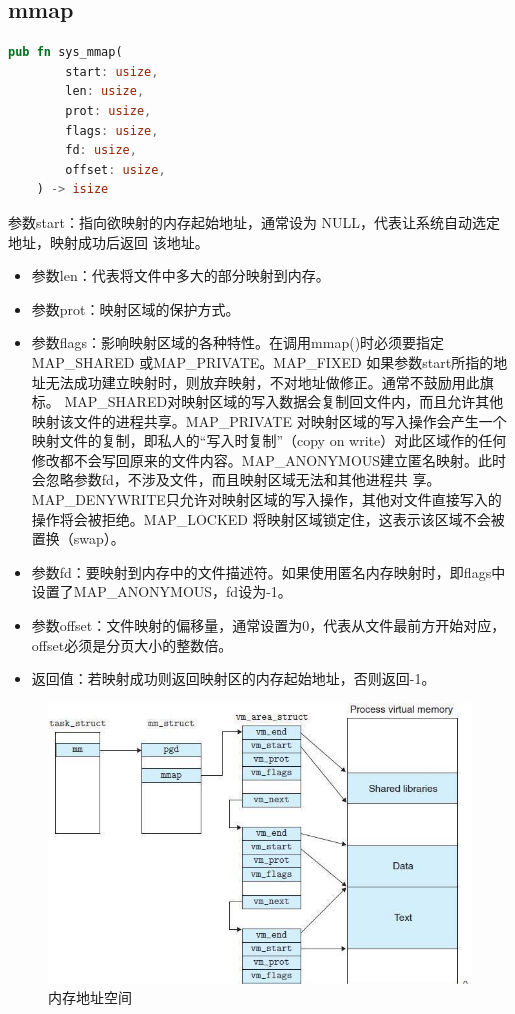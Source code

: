 \subsection{mmap}
\begin{lstlisting}[language=rust,caption={sys_mmap}]
    pub fn sys_mmap(
        start: usize,
        len: usize,
        prot: usize,
        flags: usize,
        fd: usize,
        offset: usize,
    ) -> isize
\end{lstlisting}
参数start：指向欲映射的内存起始地址，通常设为 NULL，代表让系统自动选定地址，映射成功后返回
该地址。
\begin{itemize}
    \item 参数len：代表将文件中多大的部分映射到内存。
    \item 参数prot：映射区域的保护方式。
    \item 参数flags：影响映射区域的各种特性。在调用mmap()时必须要指定MAP_SHARED 或MAP_PRIVATE。MAP_FIXED 如果参数start所指的地址无法成功建立映射时，则放弃映射，不对地址做修正。通常不鼓励用此旗标。
    MAP_SHARED对映射区域的写入数据会复制回文件内，而且允许其他映射该文件的进程共享。MAP_PRIVATE 对映射区域的写入操作会产生一个映射文件的复制，即私人的“写入时复制”（copy on
    write）对此区域作的任何修改都不会写回原来的文件内容。MAP_ANONYMOUS建立匿名映射。此时会忽略参数fd，不涉及文件，而且映射区域无法和其他进程共
    享。MAP_DENYWRITE只允许对映射区域的写入操作，其他对文件直接写入的操作将会被拒绝。MAP_LOCKED 将映射区域锁定住，这表示该区域不会被置换（swap）。
    \item 参数fd：要映射到内存中的文件描述符。如果使用匿名内存映射时，即flags中设置了MAP_ANONYMOUS，fd设为-1。
    \item 参数offset：文件映射的偏移量，通常设置为0，代表从文件最前方开始对应，offset必须是分页大小的整数倍。
    \item 返回值：若映射成功则返回映射区的内存起始地址，否则返回-1。
\end{itemize}

\begin{figure}[htb]
    \centering
    \includegraphics[width=\textwidth]{figures/04-04-内存地址空间.png}
    \caption{
        内存地址空间
    }
    \label{fig:内存地址空间}
\end{figure}

